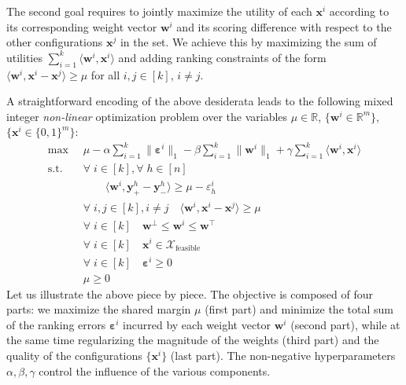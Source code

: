 \documentclass{article}
\renewcommand\[{\begin{equation}}
\renewcommand\]{\end{equation}}
\newcommand{\bbR}{\mathbb{R}}
\newcommand{\calvar}[1]{\ensuremath{\mathcal{#1}}}
\newcommand{\calX}{\calvar{X}}
\newcommand{\vecvar}[1]{\ensuremath{\boldsymbol{#1}}}
\newcommand{\vw}{\vecvar{w}}
\newcommand{\vx}{\vecvar{x}}
\newcommand{\vy}{\vecvar{y}}
\newcommand{\veps}{\vecvar{\varepsilon}}
\DeclareMathOperator*{\argmax}{argmax}
\begin{document}
The second goal requires to jointly maximize the utility of each
$\vx^{i}$ according to its corresponding weight vector $\vw^i$ and its
scoring difference with respect to the other configurations $\vx^j$ in
the set. We achieve this by maximizing the sum of utilities
$\sum_{i=1}^k \langle \vw^{i}, \vx^{i} \rangle$ and adding ranking
constraints of the form
$\langle \vw^{i}, \vx^{i} - \vx^{j} \rangle \geq \mu$ for all
$i,j\in[k]$, $i \ne j$.



A straightforward encoding of the above desiderata leads to the
following mixed integer {\em non-linear} optimization problem over the
variables $\mu \in \bbR$, $\{ \vw^i \in \bbR^m \}$, $\{ \vx^i \in \{0,1\}^m \}$:
%
{\footnotesize
\begin{align}
    \max
        & \;\; \mu - \alpha \sum_{i=1}^k \| \veps^{i} \|_1 - \beta \sum_{i=1}^k \| \vw^{i} \|_1 + \gamma \sum_{i=1}^k \langle \vw^{i}, \vx^{i} \rangle
        \nonumber
    \\
    \text{s.t.}
        & \;\; \forall \; i \in [k], \forall \; h \in [n] \nonumber
    \\
        & \;\; \qquad \langle \vw^{i}, \vy^{h}_+ - \vy^{h}_- \rangle \ge \mu - \varepsilon^{i}_h \label{eq:wyconstr}
    \\
        & \;\; \forall \; i, j \in [k], i \neq j \quad \langle \vw^{i}, \vx^{i} - \vx^{j} \rangle \ge \mu \label{eq:wxconstr}
    \\
        & \;\; \forall \; i \in [k] \quad \vw^\bot \le \vw^{i} \le \vw^\top \label{eq:wbounds}
    \\
        & \;\; \forall \; i \in [k] \quad \vx^{i} \in \calX_{\text{feasible}} \label{eq:xbounds}
    \\
        & \;\; \forall \; i \in [k] \quad \veps^{i} \ge 0 \nonumber
    \\
        & \;\; \mu \ge 0 \nonumber
\end{align}
}
%
Let us illustrate the above piece by piece. The objective is composed of four
parts: we maximize the shared margin $\mu$ (first part) and minimize the total
sum of the ranking errors $\veps^i$ incurred by each weight vector $\vw^{i}$
(second part), while at the same time regularizing the magnitude of the
weights (third part) and the quality of the configurations $\{ \vx^{i} \}$ (last
part). The non-negative hyperparameters $\alpha,\beta,\gamma$ control the
influence of the various components.
\end{document}
